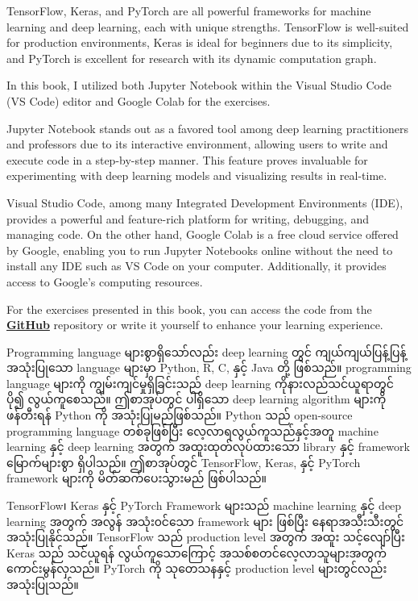 TensorFlow, Keras, and PyTorch are all powerful frameworks for machine learning and deep learning, each with unique strengths. TensorFlow is well-suited for production environments, Keras is ideal for beginners due to its simplicity, and PyTorch is excellent for research with its dynamic computation graph.

\begin{remark}
    In this book, I utilized both Jupyter Notebook within the Visual Studio Code (VS Code) editor \cite{web:VScode} and Google Colab \cite{web:googlecolab} for the exercises.

    Jupyter Notebook \cite{web:jupyter} stands out as a favored tool among deep learning practitioners and professors due to its interactive environment, allowing users to write and execute code in a step-by-step manner. This feature proves invaluable for experimenting with deep learning models and visualizing results in real-time.

    Visual Studio Code, among many Integrated Development Environments (IDE), provides a powerful and feature-rich platform for writing, debugging, and managing code. On the other hand, Google Colab is a free cloud service offered by Google, enabling you to run Jupyter Notebooks online without the need to install any IDE such as VS Code on your computer. Additionally, it provides access to Google's computing resources.

    For the exercises presented in this book, you can access the code from the \href{https://github.com/myothida}{\textbf{GitHub}} repository or write it yourself to enhance your learning experience.
\end{remark}

Programming language များစွာရှိသော်လည်း deep learning တွင် ကျယ်ကျယ်ပြန့်ပြန့်အသုံးပြုသော  language များမှာ Python, R, C, နှင့် Java တို့ ဖြစ်သည်။ programming language များကို ကျွမ်းကျင်မှုရှိခြင်းသည် deep learning ကိုနားလည်သင်ယူရာတွင် ပို၍ လွယ်ကူစေသည်။ ဤစာအုပ်တွင် ပါရှိသော deep learning algorithm များကို ဖန်တီးရန် Python \cite{web:python} ကို အသုံးပြုမည်ဖြစ်သည်။ Python သည် open-source programming language တစ်ခုဖြစ်ပြီး လေ့လာရလွယ်ကူသည်နှင့်အတူ machine learning နှင့် deep learning အတွက် အထူးထုတ်လုပ်ထားသော library နှင့် framework မြောက်များစွာ ရှိပါသည်။
ဤစာအုပ်တွင် TensorFlow, Keras, နှင့် PyTorch framework များကို မိတ်ဆက်ပေးသွားမည် ဖြစ်ပါသည်။

TensorFlow၊ Keras နှင့် PyTorch Framework များသည် machine learning နှင့် deep learning အတွက် အလွန် အသုံး၀င်သော framework များ ဖြစ်ပြီး နေရာအသီးသီးတွင် အသုံးပြုနိုင်သည်။ TensorFlow သည် production level အတွက် အထူး သင့်လျော်ပြီး Keras သည် သင်ယူရန် လွယ်ကူသောကြောင့် အသစ်စတင်လေ့လာသူများအတွက် ကောင်းမွန်လှသည်။ PyTorch ကို သုတေသနနှင့် production level များတွင်လည်း အသုံးပြုသည်။


